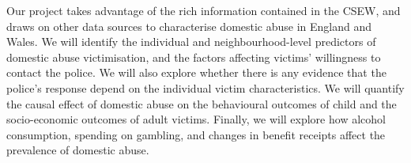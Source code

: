 \documentclass[11pt, a4paper]{article}
\begin{document}


Our project takes advantage of the rich information contained in the CSEW, and draws on other data sources to characterise domestic abuse in England and Wales. We will identify the individual and neighbourhood-level predictors of domestic abuse victimisation, and the factors affecting victims' willingness to contact the police. We will also explore whether there is any evidence that the police's response depend on the individual victim characteristics. We will quantify the causal effect of domestic abuse on the behavioural outcomes of child and the socio-economic outcomes of adult victims. Finally, we will explore how alcohol consumption, spending on gambling, and changes in benefit receipts affect the prevalence of domestic abuse.
 
\end{document}
